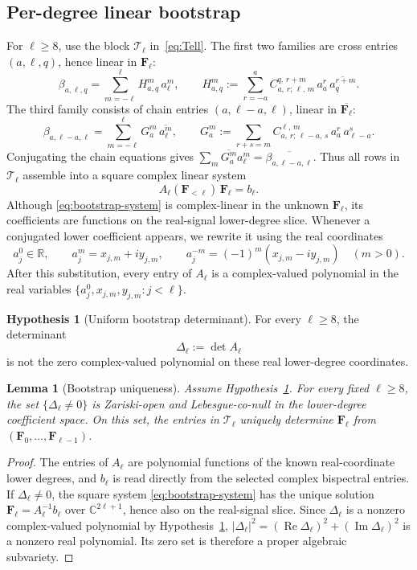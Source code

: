 \documentclass[11pt]{article}
\theoremstyle{plain}
\newtheorem{lemma}[theorem]{Lemma}
\theoremstyle{definition}
\newtheorem{hypothesis}[theorem]{Hypothesis}
\theoremstyle{remark}
\DeclareMathOperator{\im}{Im}
\DeclareMathOperator{\re}{Re}
\newcommand{\R}{\mathbb{R}}
\newcommand{\C}{\mathbb{C}}
\newcommand{\CG}[6]{C^{#5,\,#6}_{#1,\,#2;\,#3,\,#4}}
\newcommand{\abs}[1]{\lvert #1 \rvert}
\newcommand{\conj}[1]{\overline{#1}}
\begin{document}
\subsection{Per-degree linear bootstrap}
\label{sec:bootstrap}

For $\ell\ge8$, use the block $\mathcal{T}_\ell$ in~\eqref{eq:Tell}.
The first two families are cross entries $(a,\ell,q)$, hence linear in
$\mathbf{F}_\ell$:
\[
  \beta_{a,\ell,q}
  = \sum_{m=-\ell}^{\ell} H_{a,q}^{m}\, a_\ell^m,
  \qquad
  H_{a,q}^{m}
  := \sum_{r=-a}^{a}
     \CG{a}{r}{\ell}{m}{q}{r+m}\,
     a_a^r\,\conj{a_q^{r+m}} .
\]
The third family consists of chain entries $(a,\ell-a,\ell)$, linear
in $\conj{\mathbf{F}_\ell}$:
\[
  \beta_{a,\ell-a,\ell}
  = \sum_{m=-\ell}^{\ell} G_a^m\,\conj{a_\ell^m},
  \qquad
  G_a^m
  := \sum_{r+s=m}
     \CG{a}{r}{\ell-a}{s}{\ell}{m}\,
     a_a^r\,a_{\ell-a}^s .
\]
Conjugating the chain equations gives
$\sum_m \conj{G_a^m}a_\ell^m=\conj{\beta_{a,\ell-a,\ell}}$.
Thus all rows in $\mathcal{T}_\ell$ assemble into a square complex
linear system
\begin{equation}\label{eq:bootstrap-system}
  A_\ell(\mathbf{F}_{<\ell})\,\mathbf{F}_\ell=b_\ell .
\end{equation}
Although \eqref{eq:bootstrap-system} is complex-linear in the unknown
$\mathbf{F}_\ell$, its coefficients are functions on the real-signal
lower-degree slice. Whenever a conjugated lower coefficient appears,
we rewrite it using the real coordinates
\[
  a_j^0\in\R,\qquad a_j^m=x_{j,m}+i y_{j,m},\qquad
  a_j^{-m}=(-1)^m(x_{j,m}-i y_{j,m})\quad(m>0).
\]
After this substitution, every entry of $A_\ell$ is a complex-valued
polynomial in the real variables $\{a_j^0,x_{j,m},y_{j,m}:j<\ell\}$.

\begin{hypothesis}[Uniform bootstrap determinant]\label{hyp:bootstrap-det}
For every $\ell\ge8$, the determinant
\[
  \Delta_\ell
  := \det A_\ell
\]
is not the zero complex-valued polynomial on these real lower-degree
coordinates.
\end{hypothesis}

\begin{lemma}[Bootstrap uniqueness]\label{lem:bootstrap}
Assume Hypothesis~\ref{hyp:bootstrap-det}. For every fixed
$\ell\ge8$, the set $\{\Delta_\ell\ne0\}$ is Zariski-open and
Lebesgue-co-null in the lower-degree coefficient space. On this set,
the entries in $\mathcal{T}_\ell$ uniquely determine
$\mathbf{F}_\ell$ from $(\mathbf{F}_0,\dots,\mathbf{F}_{\ell-1})$.
\end{lemma}
\begin{proof}
The entries of $A_\ell$ are polynomial functions of the known
real-coordinate lower degrees, and $b_\ell$ is read directly from the
selected complex bispectral entries. If $\Delta_\ell\ne0$, the square system
\eqref{eq:bootstrap-system} has the unique solution
$\mathbf{F}_\ell=A_\ell^{-1}b_\ell$ over $\C^{2\ell+1}$, hence also
on the real-signal slice. Since $\Delta_\ell$ is a nonzero
complex-valued polynomial by Hypothesis~\ref{hyp:bootstrap-det},
$\abs{\Delta_\ell}^2=(\re\Delta_\ell)^2+(\im\Delta_\ell)^2$ is a
nonzero real polynomial. Its zero set is therefore a proper algebraic
subvariety.
\end{proof}
\end{document}
